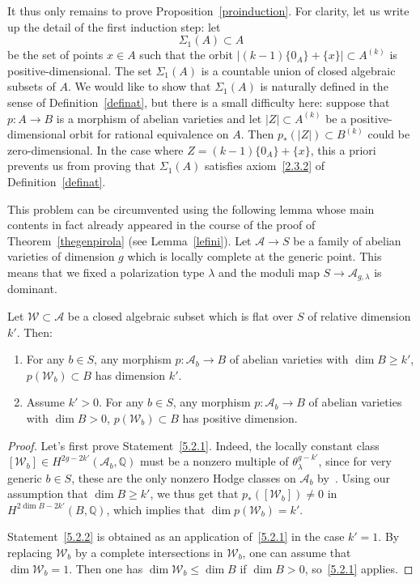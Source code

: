 It thus only remains to prove Proposition~\ref{proinduction}. For clarity, let us write up the detail of the first induction step: let
\begin{equation}\label{eqnomsigma1}
\Sigma_1(A)\subset A
\end{equation}
be the set of points $x\in A$ such that the orbit $|(k-1)\{0_A\}+\{x\}|\subset A^{(k)}$ is positive-dimensional. The set $\Sigma_1(A)$ is a countable union of closed algebraic subsets of $A$. We would like to show that $\Sigma_1(A)$ is naturally defined in the sense of Definition~\ref{definat}, but there is a small difficulty here: suppose that $p:A\rightarrow B$ is a morphism of abelian varieties and let $|Z|\subset A^{(k)} $ be a positive-dimensional orbit for rational equivalence on $A$. Then $p_*(|Z|)\subset B^{(k)} $ could be zero-dimensional. In the case where $Z=(k-1)\{0_A\}+\{x\}$, this a priori prevents us from proving that $\Sigma_1(A)$ satisfies axiom~\eqref{2.3.2} of Definition~\ref{definat}.

This problem can be circumvented using the following lemma whose main contents in fact already appeared in the course of the proof of Theorem~\ref{thegenpirola} (see Lemma~\ref{lefini}). Let $\mathcal{A}\rightarrow S$ be a family of abelian varieties of dimension $g$ which is locally complete at the generic point. This means that we fixed a polarization type $\lambda$ and the moduli map $S\rightarrow\mathcal{A}_{g,\lambda}$ is dominant.

\begin{lemm}\label{generic}
Let $\mathcal{W}\subset \mathcal{A}$ be a closed algebraic subset which is
flat over $S$ of relative dimension $k'$. Then:
\begin{enumerate}
\item \label{5.2.1} For any $b\in S$, any morphism $p: \mathcal{A}_b\rightarrow B$ of abelian varieties with $\dim B\geq k'$, $p(\mathcal{W}_b)\subset B$ has dimension $k'$.
\item \label{5.2.2} Assume $k'>0$. For any $b\in S$, any morphism $p: \mathcal{A}_b\rightarrow B$ of abelian varieties with $\dim B>0$, $p(\mathcal{W}_b)\subset B$ has positive dimension.
\end{enumerate}
\end{lemm}

\begin{proof}
Let's first prove Statement~\eqref{5.2.1}. Indeed, the locally constant class $[\mathcal{W}_b]\in H^{2g-2k'}(\mathcal{A}_b,\mathbb{Q})$ must be a nonzero multiple of $\theta_\lambda^{g-k'}$, since for very generic $b\in S$, these are the only nonzero Hodge classes on $\mathcal{A}_b$ by~\cite{mattuck}. Using our assumption that $\dim B\geq k'$, we thus get that $p_*([\mathcal{W}_b])\not=0$ in $H^{2\dim B-2k'}(B,\mathbb{Q})$, which implies that $\dim p(\mathcal{W}_b)=k'$.

Statement~\eqref{5.2.2} is obtained as an application of~\eqref{5.2.1} in the case $k'=1$. By replacing $\mathcal{W}_b$ by a complete intersections in $\mathcal{W}_b$, one can assume that $\dim \mathcal{W}_b=1$. Then one has $\dim \mathcal{W}_b\leq\dim B$ if $\dim B>0$, so~\eqref{5.2.1} applies.
\end{proof}

